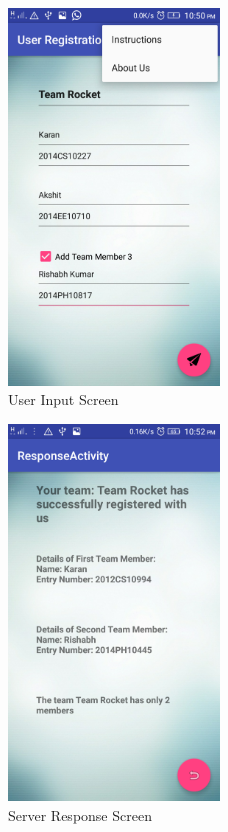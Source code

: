 \documentclass[12pt,a4paper,titlepage]{article}
\begin{document}
\begin{figure}[!ht]
	\centering
	\includegraphics[width=0.5\textwidth]{./screen_main}
	\caption{User Input Screen}
\end{figure}
\begin{figure}[!ht]
	\centering
	\includegraphics[width=0.5\textwidth]{./screen_response}
	\caption{Server Response Screen}
\end{figure}
\end{document}
